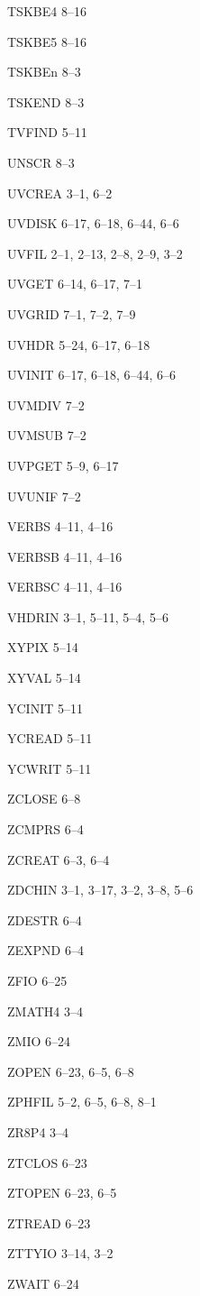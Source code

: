 \item TSKBE4 8--16
\item TSKBE5 8--16
\item TSKBEn 8--3
\item TSKEND 8--3
\item TVFIND 5--11
\item UNSCR 8--3
\item UVCREA 3--1, 6--2
\item UVDISK 6--17, 6--18, 6--44, 6--6
\item UVFIL 2--1, 2--13, 2--8, 2--9, 3--2
\item UVGET 6--14, 6--17, 7--1
\item UVGRID 7--1, 7--2, 7--9
\item UVHDR 5--24, 6--17, 6--18
\item UVINIT 6--17, 6--18, 6--44, 6--6
\item UVMDIV 7--2
\item UVMSUB 7--2
\item UVPGET 5--9, 6--17
\item UVUNIF 7--2
\item VERBS 4--11, 4--16
\item VERBSB 4--11, 4--16
\item VERBSC 4--11, 4--16
\item VHDRIN 3--1, 5--11, 5--4, 5--6
\item XYPIX 5--14
\item XYVAL 5--14
\item YCINIT 5--11
\item YCREAD 5--11
\item YCWRIT 5--11
\item ZCLOSE 6--8
\item ZCMPRS 6--4
\item ZCREAT 6--3, 6--4
\item ZDCHIN 3--1, 3--17, 3--2, 3--8, 5--6
\item ZDESTR 6--4
\item ZEXPND 6--4
\item ZFIO 6--25
\item ZMATH4 3--4
\item ZMIO 6--24
\item ZOPEN 6--23, 6--5, 6--8
\item ZPHFIL 5--2, 6--5, 6--8, 8--1
\item ZR8P4 3--4
\item ZTCLOS 6--23
\item ZTOPEN 6--23, 6--5
\item ZTREAD 6--23
\item ZTTYIO 3--14, 3--2
\item ZWAIT 6--24
